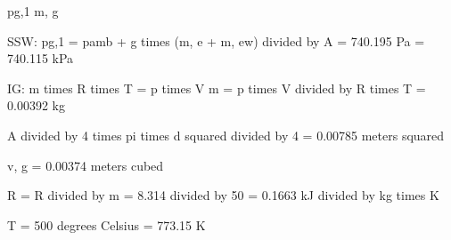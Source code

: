 pg,1 m, g

SSW: pg,1 = pamb + g times (m, e + m, ew) divided by A
= 740.195 Pa
= 740.115 kPa

IG: m times R times T = p times V
m = p times V divided by R times T
= 0.00392 kg

A divided by 4 times pi times d squared divided by 4 = 0.00785 meters squared

v, g = 0.00374 meters cubed

R = R divided by m = 8.314 divided by 50 = 0.1663 kJ divided by kg times K

T = 500 degrees Celsius = 773.15 K
